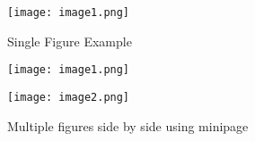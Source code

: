 \documentclass[10pt]{article}
\begin{document}
\begin{figure}[htbp]
    \centering
    \texttt{[image: image1.png]}
    \caption{Single Figure Example}
    \label{fig:single_figure}
\end{figure}

\begin{figure}[htbp]
    \centering
    \begin{minipage}{0.45\textwidth}
        \centering
        \texttt{[image: image1.png]}
        \label{fig:1}
    \end{minipage}
    \hfill
    \begin{minipage}{0.45\textwidth}
        \centering
        \texttt{[image: image2.png]}
        \label{fig:2}
    \end{minipage}
    \caption{Multiple figures side by side using minipage}
    \label{fig:multi_figures}
\end{figure}
\end{document}
